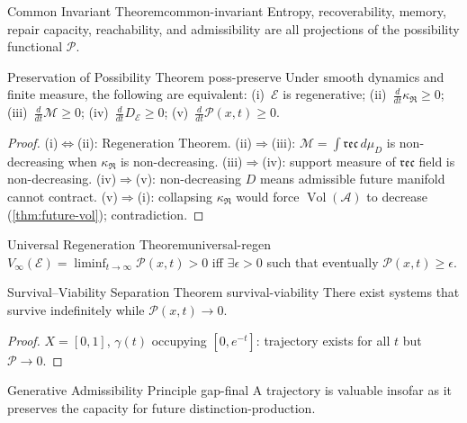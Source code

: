 \documentclass[12pt,twoside,openright]{book}
\newcommand{\adm}{\mathcal{A}}
\newcommand{\repair}{\mathfrak{R}}
\newcommand{\reco}{\mathfrak{rec}}
\newcommand{\Vol}{\operatorname{Vol}}
\begin{document}
\begin{theorem}{Common Invariant Theorem}{common-invariant}
  Entropy, recoverability, memory, repair capacity,
  reachability, and admissibility are all projections
  of the possibility functional $\mathcal{P}$.
\end{theorem}

\begin{theorem}{Preservation of Possibility Theorem}%
  {poss-preserve}
  Under smooth dynamics and finite measure, the following
  are equivalent:
  (i)~$\mathcal{E}$ is regenerative;
  (ii)~$\frac{d}{dt}\kappa_\repair\ge0$;
  (iii)~$\frac{d}{dt}\mathcal{M}\ge0$;
  (iv)~$\frac{d}{dt}D_\mathcal{E}\ge0$;
  (v)~$\frac{d}{dt}\mathcal{P}(x,t)\ge0$.
\end{theorem}
\begin{proof}
  (i)$\Leftrightarrow$(ii): Regeneration Theorem.
  (ii)$\Rightarrow$(iii): $\mathcal{M}=\int\reco\,d\mu_D$
  is non-decreasing when $\kappa_\repair$ is non-decreasing.
  (iii)$\Rightarrow$(iv): support measure of
  $\reco$ field is non-decreasing.
  (iv)$\Rightarrow$(v): non-decreasing $D$ means
  admissible future manifold cannot contract.
  (v)$\Rightarrow$(i): collapsing $\kappa_\repair$ would
  force $\Vol(\adm)$ to decrease
  (\cref{thm:future-vol}); contradiction.
\end{proof}

\begin{theorem}{Universal Regeneration Theorem}{universal-regen}
  $V_\infty(\mathcal{E})=\liminf_{t\to\infty}
  \mathcal{P}(x,t)>0$
  iff $\exists\epsilon>0$ such that eventually
  $\mathcal{P}(x,t)\ge\epsilon$.
\end{theorem}

\begin{theorem}{Survival--Viability Separation Theorem}%
  {survival-viability}
  There exist systems that survive indefinitely while
  $\mathcal{P}(x,t)\to0$.
\end{theorem}
\begin{proof}
  $X=[0,1]$, $\gamma(t)$ occupying $[0,e^{-t}]$:
  trajectory exists for all $t$ but
  $\mathcal{P}\to0$.
\end{proof}

\begin{principle}{Generative Admissibility Principle}%
  {gap-final}
  A trajectory is valuable insofar as it preserves the
  capacity for future distinction-production.
\end{principle}
\end{document}
